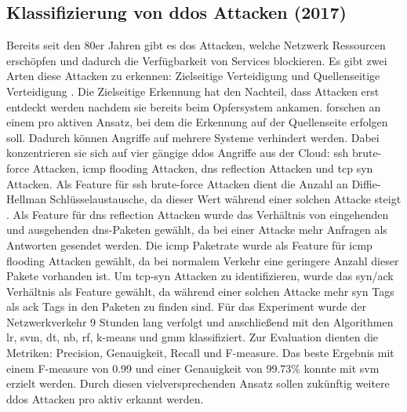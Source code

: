 \documentclass[
    12pt, %
    DIV10,
    ngerman, %
    a4paper, %
    oneside, %
    titlepage, %
    parskip=half, %
    headings=normal, %
    listof=totoc, %
    bibliography=totoc, %
    index=totoc, %
    captions=tableheading, %
    final %
]{scrreprt}
\begin{document}
\subsection{Klassifizierung von \acs{ddos} Attacken (2017)}
Bereits seit den 80er Jahren gibt es \ac{dos} Attacken, welche Netzwerk Ressourcen erschöpfen und dadurch die Verfügbarkeit von Services blockieren. Es gibt zwei Arten diese Attacken zu erkennen: Zielseitige Verteidigung und Quellenseitige Verteidigung \parencite{He2017}. Die Zielseitige Erkennung hat den Nachteil, dass Attacken erst entdeckt werden nachdem sie bereits beim Opfersystem ankamen. \textcite{He2017} forschen an einem pro aktiven Ansatz, bei dem die Erkennung auf der Quellenseite erfolgen soll. Dadurch können Angriffe auf mehrere Systeme verhindert werden. Dabei konzentrieren sie sich auf vier gängige \ac{ddos} Angriffe aus der Cloud: \ac{ssh} brute-force Attacken, \ac{icmp} flooding Attacken, \ac{dns} reflection Attacken und \ac{tcp} \ac{syn} Attacken. Als Feature für \ac{ssh} brute-force Attacken dient die Anzahl an Diffie-Hellman Schlüsselaustausche, da dieser Wert während einer solchen Attacke steigt \parencite{He2017}. Als Feature für \ac{dns} reflection Attacken wurde das Verhältnis von eingehenden und ausgehenden \ac{dns}-Paketen gewählt, da bei einer Attacke mehr Anfragen als Antworten gesendet werden. Die \ac{icmp} Paketrate wurde als Feature für \ac{icmp} flooding Attacken gewählt, da bei normalem Verkehr eine geringere Anzahl dieser Pakete vorhanden ist. Um \ac{tcp}-\ac{syn} Attacken zu identifizieren, wurde das \ac{syn}/\ac{ack} Verhältnis als Feature gewählt, da während einer solchen Attacke mehr \ac{syn} Tags als \ac{ack} Tags in den Paketen zu finden sind. Für das Experiment wurde der Netzwerkverkehr 9 Stunden lang verfolgt und anschließend mit den Algorithmen \ac{lr}, \ac{svm}, \ac{dt}, \ac{nb}, \ac{rf}, k-means und \ac{gmm} klassifiziert. Zur Evaluation dienten die Metriken: Precision, Genauigkeit, Recall und F-measure. Das beste Ergebnis mit einem F-measure von 0.99 und einer Genauigkeit von 99.73\% konnte mit \ac{svm} erzielt werden.
Durch diesen vielversprechenden Ansatz sollen zukünftig weitere \ac{ddos} Attacken pro aktiv erkannt werden.
%
\end{document}
